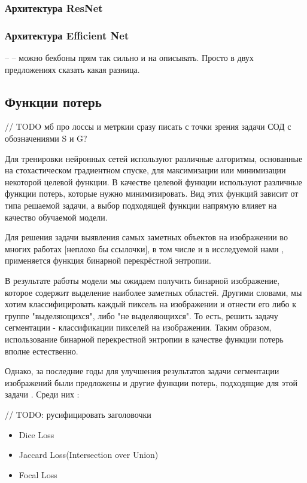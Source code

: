 \subsubsection{Архитектура ResNet}
\subsubsection{Архитектура Efficient Net}  --
    -- можно бекбоны прям так сильно и на описывать. Просто в двух предложениях сказать какая разница.

\subsection{Функции потерь}


// TODO мб про лоссы и метркии сразу писать с точки зрения задачи СОД с обозначениями S и G?

Для тренировки нейронных сетей используют различные алгоритмы, основанные на стохастическом градиентном спуске,
для максимизации или минимизации некоторой целевой функции. В качестве целевой функции используют различные функции потерь, 
которые нужно минимизировать. Вид этих функций зависит от типа решаемой задачи, а выбор подходящей функции напрямую влияет на 
качество обучаемой модели. 

Для решения задачи выявления самых заметных объектов на изображении 
во многих работах [неплохо бы ссылочки], в том числе и в исследуемой нами \cite{BBS}, применяется функция бинарной перекрёстной энтропии.

В результате работы модели мы ожидаем получить бинарной изображение, которое содержит выделение наиболее заметных областей. 
Другими словами, мы хотим классифицировать каждый пиксель на изображении и отнести его либо к группе "выделяющихся", либо "не выделяющихся". То есть,
решить задачу сегментации - классификации пикселей на изображении. Таким образом, использование бинарной перекрестной энтропии 
в качестве функции потерь вполне естественно.

Однако, за последние годы для улучшения результатов задачи сегментации изображений были предложены и другие функции потерь, подходящие для 
этой задачи \cite{Loss-Functions}. Среди них : 


// TODO: русифицировать заголовочки

\begin{itemize}
    \item Dice Loss \cite{Dice-Loss}
    \item Jaccard Loss(Intersection over Union) \cite{IoU-Loss}
    \item Focal Loss \cite{Focal-Loss}
\end{itemize}

